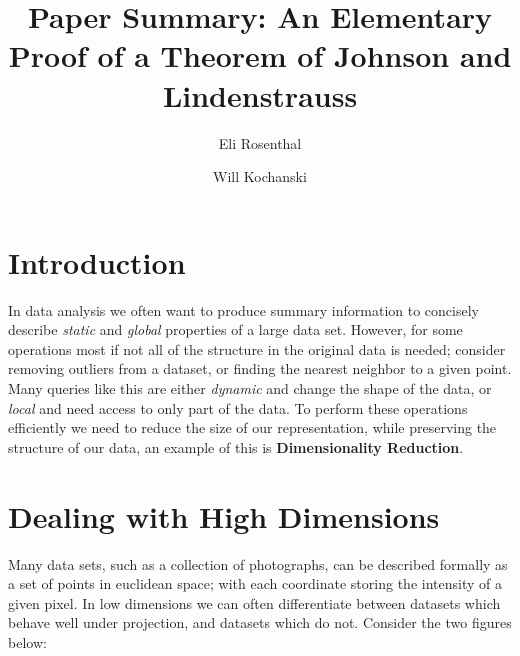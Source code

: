 \documentclass[11pt]{article}
\author{Eli Rosenthal \and Will Kochanski}
\date{}
\title{Paper Summary: An Elementary Proof of a Theorem of Johnson and Lindenstrauss}
\begin{document}
\maketitle
\section{Introduction}
In data analysis we often want to produce summary information to concisely describe \textit{static} and \textit{global} properties of a large data set. However, for some operations most if not all of the structure in the original data is needed; consider removing outliers from a dataset, or finding the nearest neighbor to a given point. Many queries like this are either \textit{dynamic} and change the shape of the data, or \textit{local} and need access to only part of the data. To perform these operations efficiently we need to reduce the size of our representation, while preserving the structure of our data, an example of this is \textbf{Dimensionality Reduction}.

\section{Dealing with High Dimensions}
Many data sets, such as a collection of photographs, can be described formally as a set of points in euclidean space; with each coordinate storing the intensity of a given pixel. In low dimensions we can often differentiate between datasets which behave well under projection, and datasets which do not. Consider the two figures below:
\end{document}
